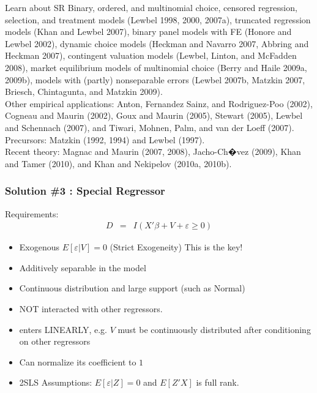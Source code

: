 \begin{frame}{Learn about SR}
\small
Binary, ordered, and multinomial choice, censored regression, selection, and treatment models (Lewbel 1998, 2000, 2007a), truncated regression models (Khan and Lewbel 2007), binary panel models with FE (Honore and Lewbel 2002), dynamic choice models (Heckman and Navarro 2007, Abbring and Heckman 2007), contingent valuation models (Lewbel, Linton, and McFadden 2008), market equilibrium models of multinomial choice (Berry and Haile 2009a, 2009b), models with (partly) nonseparable errors (Lewbel 2007b, Matzkin 2007, Briesch, Chintagunta, and Matzkin 2009).\\
Other empirical applications: Anton, Fernandez Sainz, and Rodriguez-Poo (2002), Cogneau and Maurin (2002), Goux and Maurin (2005), Stewart (2005), Lewbel and Schennach (2007), and Tiwari, Mohnen, Palm, and van der Loeff (2007).\\
Precursors: Matzkin (1992, 1994) and Lewbel (1997).\\
Recent theory: Magnac and Maurin (2007, 2008), Jacho-Ch�vez (2009), Khan and Tamer (2010), and Khan and Nekipelov (2010a, 2010b).
\end{frame}


\begin{frame}
\frametitle{Solution \#3 : Special Regressor}
Requirements:
\begin{eqnarray*}
D &=& I ( X' \beta + V + \varepsilon \geq 0 )
\end{eqnarray*}
\begin{itemize}
\item Exogenous $E[\varepsilon | V ] =0$ (Strict Exogeneity) \alert{This is the key!} 
\item Additively separable in the model
\item Continuous distribution and large support (such as Normal)
\item NOT interacted with other regressors.
\item enters LINEARLY, e.g. $V$ must be continuously distributed after conditioning on other regressors
\item Can normalize its coefficient to $1$
\item 2SLS Assumptions: $E[ \varepsilon | Z] = 0$ and $E[Z'X]$ is full rank.
\end{itemize}
\end{frame}

